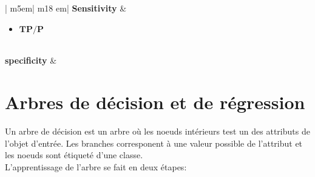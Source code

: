 \begin{table}[!h]
    \begin{center}
    \begin{tabular}{| m{5em}| m{18 em}|}
    \hline
    \centering
     \textbf{Sensitivity} & \begin{itemize}
        \item $\textbf{TP/P}$ 
    \end{itemize}  \\ \hline 
    \centering
     \textbf{specificity}  &  \begin{itemize}
        \item $\textbf{TN}}{\textbf{TN+FP} = 1-FP/N$
    \end{itemize}
    \end{tabular}
    \end{center}
\end{table}






\section{Arbres de décision et de régression}
Un arbre de décision est un arbre où les noeuds intérieurs test un des attributs de l'objet d'entrée. Les branches corresponent à une valeur possible de l'attribut et les noeuds sont étiqueté d'une classe.\\
L'apprentissage de l'arbre se fait en deux étapes: 

